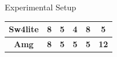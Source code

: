 \documentclass[final]{beamer}
\newlength{\onecolwid}
\newlength{\twocolwid}
\begin{document}
\begin{frame}[t]
\begin{columns}[t]
\begin{column}{\twocolwid}
\begin{columns}[t,totalwidth=\twocolwid]
\begin{column}{\onecolwid}
\begin{block}{Experimental Setup}
\begin{table}
\begin{adjustbox}{width=\columnwidth,height=0.3\columnwidth,left,valign=m}
\begin{tabular}{|c|c|c|c|c|c|}
\cellcolor{ProcessBlue!10}\textbf{Sw4lite} & \cellcolor{ProcessBlue!10}\textbf{8}  & \cellcolor{ProcessBlue!10}\textbf{5}  & \cellcolor{ProcessBlue!10}\textbf{4}  & \cellcolor{ProcessBlue!10}\textbf{8}  & \cellcolor{ProcessBlue!10}\textbf{5}  \\ \hline

\textbf{Amg} & \textbf{8} & \textbf{5} & \textbf{5} & \textbf{5} & \textbf{12}  \\ \hline


\end{tabular}


\end{adjustbox}
\end{table}
\end{block}
\end{column}
\end{columns}
\end{column}
\end{columns}
\end{frame}
\end{document}
